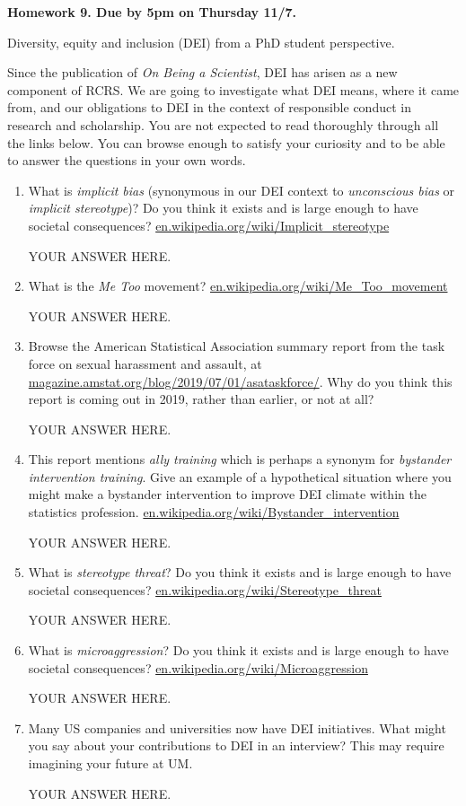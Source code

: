 \documentclass[12pt]{article}
\begin{document}
\begin{center}\bf
Homework 9. Due by 5pm on Thursday 11/7.

Diversity, equity and inclusion (DEI) from a PhD student perspective.

\end{center}

Since the publication of {\em On Being a Scientist}, DEI has arisen as a new component of RCRS. 
We are going to investigate what DEI means, where it came from, and our obligations to DEI in the context of responsible conduct in research and scholarship.
You are not expected to read thoroughly through all the links below.
You can browse enough to satisfy your curiosity and to be able to answer the questions in your own words.

\begin{enumerate}

\item What is {\em implicit bias} (synonymous in our DEI context to {\em unconscious bias} or {\em implicit stereotype})? Do you think it exists and is large enough to have societal consequences? 
\url{en.wikipedia.org/wiki/Implicit_stereotype}

YOUR ANSWER HERE.

\item What is the {\em Me Too} movement? \url{en.wikipedia.org/wiki/Me_Too_movement}

YOUR ANSWER HERE.

\item Browse the American Statistical Association summary report from the task force on sexual harassment and assault, at \url{magazine.amstat.org/blog/2019/07/01/asataskforce/}.
Why do you think this report is coming out in 2019, rather than earlier, or not at all?

YOUR ANSWER HERE.

\item This report mentions {\em ally training} which is perhaps a synonym for {\em bystander intervention training}. Give an example of a hypothetical situation where you might make a bystander intervention to improve DEI climate within the statistics profession. \url{en.wikipedia.org/wiki/Bystander_intervention}

YOUR ANSWER HERE.

\item What is {\em stereotype threat}? Do you think it exists and is large enough to have societal consequences? \url{en.wikipedia.org/wiki/Stereotype_threat}

YOUR ANSWER HERE.

\item What is {\em microaggression}? Do you think it exists and is large enough to have societal consequences? \url{en.wikipedia.org/wiki/Microaggression}

YOUR ANSWER HERE.

\item Many US companies and universities now have DEI initiatives. What might you say about your contributions to DEI in an interview? This may require imagining your future at UM.

YOUR ANSWER HERE.

\end{enumerate}
\end{document}
